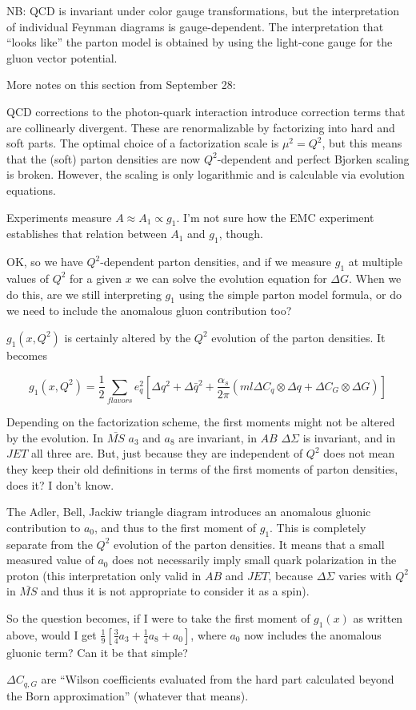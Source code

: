 NB: QCD is invariant under color gauge transformations, but the interpretation of individual Feynman diagrams is gauge-dependent.  The interpretation that ``looks like'' the parton model is obtained by using the light-cone gauge for the gluon vector potential.

More notes on this section from September 28:

QCD corrections to the photon-quark interaction introduce correction terms that are collinearly divergent.  These are renormalizable by factorizing into hard and soft parts.  The optimal choice of a factorization scale is $\mu^2 = Q^2$, but this means that the (soft) parton densities are now $Q^2$-dependent and perfect Bjorken scaling is broken.  However, the scaling is only logarithmic and is calculable via evolution equations.

Experiments measure $A \approx A_1 \propto g_1$.  I'm not sure how the EMC experiment establishes that relation between $A_1$ and $g_1$, though.

OK, so we have $Q^2$-dependent parton densities, and if we measure $g_1$ at multiple values of $Q^2$ for a given $x$ we can solve the evolution equation for $\Delta G$.  When we do this, are we still interpreting $g_1$ using the simple parton model formula, or do we need to include the anomalous gluon contribution too?

$g_1(x, Q^2)$ is certainly altered by the $Q^2$ evolution of the parton densities.  It becomes

\begin{equation}
  g_1(x, Q^2) = \frac{1}{2} \sum_{flavors} e_q^2 \left[\Delta q^2 + \Delta \bar{q}^2 + \frac{\alpha_s}{2 \pi} \left(ml\Delta C_q \otimes \Delta q + \Delta C_G \otimes \Delta G\right)\right]
\end{equation}

Depending on the factorization scheme, the first moments might not be altered by the evolution. In $\bar{MS}$ $a_3$ and $a_8$ are invariant, in $AB$ $\Delta \Sigma$ is invariant, and in $JET$ all three are.  But, just because they are independent of $Q^2$ does not mean they keep their old definitions in terms of the first moments of parton densities, does it?  I don't know.

The Adler, Bell, Jackiw triangle diagram introduces an anomalous gluonic contribution to $a_0$, and thus to the first moment of $g_1$.  This is completely separate from the $Q^2$ evolution of the parton densities.  It means that a small measured value of $a_0$ does not necessarily imply small quark polarization in the proton (this interpretation only valid in $AB$ and $JET$, because $\Delta \Sigma$ varies with $Q^2$ in $\bar{MS}$ and thus it is not appropriate to consider it as a spin).

So the question becomes, if I were to take the first moment of $g_1(x)$ as written above, would I get $\frac{1}{9}\left[\frac{3}{4}a_3+\frac{1}{4}a_8 + a_0\right]$, where $a_0$ now includes the anomalous gluonic term?  Can it be that simple?

$\Delta C_{q,G}$ are ``Wilson coefficients evaluated from the hard part calculated beyond the Born approximation'' (whatever that means).
